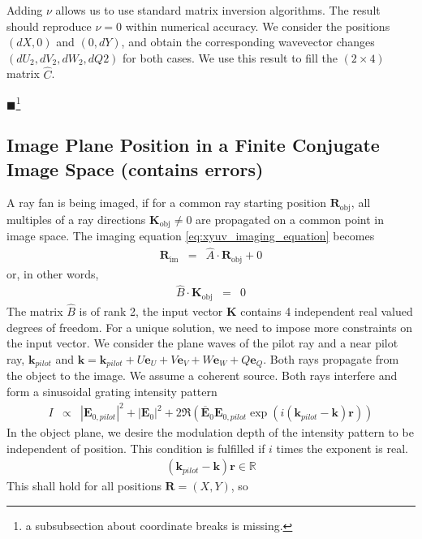 \documentclass[12pt,a4paper,twoside,openright,BCOR10mm,headsepline,titlepage,abstracton,chapterprefix,final]{scrreprt}
\newcommand\Vector[1]{{\mathbf{#1}}}
\newcommand\Location{\Vector{r}}
\newcommand\wavenumber{k}
\newcommand\Wavevector{\Vector{\wavenumber}}
\newcommand\scalarEfield{E}
\newcommand\Efield{\Vector{\scalarEfield}}
\newcommand{\remark}[1]{{\color{red}$\blacksquare$}\footnote{{\color{red}#1}}}
\newcommand\im{\textrm{im}}
\newcommand\obj{\textrm{obj}}
\begin{document}
Adding $\nu$ allows us to use standard matrix inversion algorithms.
The result should reproduce $\nu=0$ within numerical accuracy.
We consider the positions $(dX,0)$ and $(0,dY)$, and obtain the corresponding wavevector changes $(dU_2,dV_2, dW_2, dQ2)$ for both cases.
We use this result to fill the $(2\times4)$ matrix $\hat{C}$.

\remark{a subsubsection about coordinate breaks is missing.}

\subsection{Image Plane Position in a Finite Conjugate Image Space (contains errors)} \label{sec:xyuv_image_plane_position}
A ray fan is being imaged, 
if for a common ray starting position $\Vector{R}_\obj$, all multiples of a
ray directions $\Vector{K}_\obj \neq 0$ are propagated on a common point in image space.
The imaging equation \eqref{eq:xyuv_imaging_equation} becomes
\begin{eqnarray}
 \Vector{R}_\im &=& \hat{A} \cdot \Vector{R}_\obj + 0
\end{eqnarray}
or, in other words,
\begin{eqnarray}
 \hat{B} \cdot \Vector{K}_\obj &=& 0
\end{eqnarray}
The matrix $\hat{B}$ is of rank 2, the input vector $\Vector{K}$ contains 4 independent real valued degrees of freedom.
For a unique solution, we need to impose more constraints on the input vector. 
We consider the plane waves of the pilot ray and a near pilot ray, 
$\Wavevector_{pilot}$ and 
$\Wavevector = \Wavevector_{pilot} + U \Vector{e}_U + V \Vector{e}_V + W \Vector{e}_W + Q \Vector{e}_Q$.
Both rays propagate from the object to the image.
We assume a coherent source.
Both rays interfere and form a sinusoidal grating intensity pattern
\begin{eqnarray}
 I &\propto& |\Efield_{0,pilot}|^2 + |\Efield_{0}|^2 + 2 \Re \left( \overline{\Efield}_{0}\Efield_{0,pilot} \exp(i(\Wavevector_{pilot} - \Wavevector)\Location) \right)
\end{eqnarray}
In the object plane, we desire the modulation depth of the intensity pattern to be independent of position.
This condition is fulfilled if $i$ times the exponent is real.
\begin{eqnarray}
 (\Wavevector_{pilot} - \Wavevector)\Location \in \mathbb{R} \label{eq:xyuvRealGratingConstraint}
\end{eqnarray}
This shall hold for all positions $\Vector{R}=(X,Y)$, so
\end{document}

